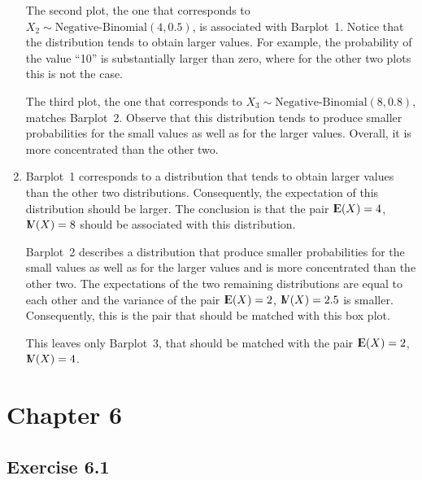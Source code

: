 \documentclass[]{krantz}
\newcommand{\Expec}{{\rm I\kern-.3em E}}
\newcommand{\Var}{{\rm I\kern-.3em V}}
\theoremstyle{definition}
\theoremstyle{definition}
\theoremstyle{definition}
\theoremstyle{remark}
\begin{document}
\begin{enumerate}
  The second plot, the one that corresponds to
  \(X_2 \sim \mbox{Negative-Binomial}(4,0.5)\), is associated with
  Barplot~1. Notice that the distribution tends to obtain larger values.
  For example, the probability of the value ``10'' is substantially larger
  than zero, where for the other two plots this is not the case.

  The third plot, the one that corresponds to
  \(X_3 \sim \mbox{Negative-Binomial}(8,0.8)\), matches Barplot~2. Observe
  that this distribution tends to produce smaller probabilities for the
  small values as well as for the larger values. Overall, it is more
  concentrated than the other two.
\item
  Barplot~1 corresponds to a
  distribution that tends to obtain larger values than the other two
  distributions. Consequently, the expectation of this distribution should
  be larger. The conclusion is that the pair \(\Expec(X) = 4\),
  \(\Var(X) = 8\) should be associated with this distribution.

  Barplot~2 describes a distribution that produce smaller probabilities
  for the small values as well as for the larger values and is more
  concentrated than the other two. The expectations of the two remaining
  distributions are equal to each other and the variance of the pair
  \(\Expec(X) = 2\), \(\Var(X) = 2.5\) is smaller. Consequently, this is the
  pair that should be matched with this box plot.

  This leaves only Barplot~3, that should be matched with the pair
  \(\Expec(X) = 2\), \(\Var(X) = 4\).
\end{enumerate}

\hypertarget{chapter-6}{%
\section*{Chapter 6}\label{chapter-6}}


\hypertarget{exercise-6.1}{%
\subsection*{Exercise 6.1}\label{exercise-6.1}}
\end{document}
